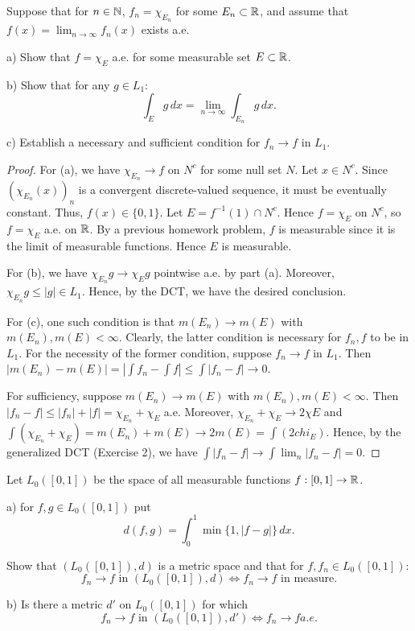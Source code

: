 \documentclass{article}
\begin{document}
 Suppose that for $n \in \mathbb{N}$, $f_n = \chi_{E_n}$ for some $E_n \subset \mathbb{R}$, and assume that $f(x) = \lim_{n \to \infty} f_n(x)$ exists a.e.

a) Show that $f = \chi_E$ a.e. for some measurable set $E \subset \mathbb{R}$.

b) Show that for any $g \in L_1$:
$$ \int_E g \, dx = \lim_{n \to \infty} \int_{E_n} g \, dx.$$

c) Establish a necessary and sufficient condition for $f_n \to f$ in $L_1$.

\begin{proof}
For (a), we have $\chi_{E_n} \to f$ on $N^c$ for some null set $N$.  Let $x \in N^c$. Since $(\chi_{E_n}(x))_n$ is a convergent discrete-valued sequence, it must be eventually constant.  Thus, $f(x) \in \{0,1\}$.  Let $E = f^{-1}(1) \cap N^c$.  Hence $f = \chi_E$ on $N^c$, so $f = \chi_E$ a.e. on $\mathbb{R}$. By a previous homework problem, $f$ is measurable since it is the limit of measurable functions.  Hence $E$ is measurable.  

For (b), we have $\chi_{E_n} g \to \chi_E g$ pointwise a.e. by part (a).  Moreover, $\chi_{E_n} g \le |g| \in L_1$. Hence, by the DCT, we have the desired conclusion.

For (c), one such condition is that $m(E_n) \to m(E)$ with $m(E_n), m(E) < \infty$.  Clearly, the latter condition is necessary for $f_n, f$ to be in $L_1$.  For the necessity of the former condition, suppose $f_n \to f$ in $L_1$.  Then $|m(E_n) - m(E)| = |\int f_n - \int f | \le \int |f_n - f| \to 0$.

For sufficiency, suppose $m(E_n) \to m(E)$ with $m(E_n), m(E) < \infty$.    Then $|f_n - f| \le |f_n| + |f| = \chi_{E_n} + \chi_E$ a.e.  Moreover, $\chi_{E_n} + \chi_E \to 2 \chi E$ and $\int (\chi_{E_n} + \chi_E) = m(E_n) + m(E) \to 2 m(E) = \int (2 chi_E)$.  Hence, by the generalized DCT (Exercise 2), we have
$\int |f_n - f| \to \int \lim_n |f_n - f| = 0$.
\end{proof}

 Let $L_0([0,1])$ be the space of all measurable functions $f : [0,1] \to \mathbb{R}$.

a) for $f,g \in L_0([0,1])$ put
$$d(f, g) = \int_0^1 \min\{1, |f - g|\} \, dx.$$

Show that $(L_0([0,1]), d)$ is a metric space and that for $f, f_n \in L_0([0,1])$:
$$ f_n \to f \text{ in } (L_0([0,1]), d) \iff f_n \to f \text { in measure.}$$

b) Is there a metric $d'$ on $L_0([0,1])$ for which 
$$f_n \to f \text{ in } (L_0([0,1]), d') \iff f_n \to f a.e.  $$
\end{document}
